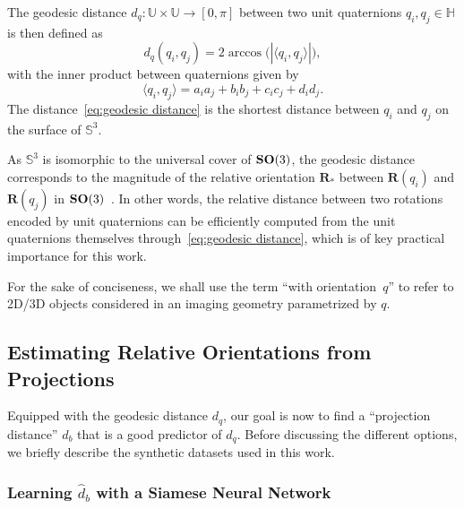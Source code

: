The geodesic distance $d_q:\mathbb{U}\times\mathbb{U}\rightarrow [0,\pi]$ between two unit quaternions $q_i, q_j\in\mathbb{H}$ is then defined as
\begin{equation}
    \label{eq:geodesic distance}
    d_q(q_i,q_j)=2\arccos\big(|\langle q_i, q_j \rangle|\big),
\end{equation}
with the inner product between quaternions given by
\begin{equation}
    \label{eq:inner-product-quaternions}
    \langle q_i, q_j \rangle = a_ia_j+b_ib_j+c_ic_j+d_id_j.
\end{equation}
The distance~\eqref{eq:geodesic distance} is the shortest distance between $q_i$ and $q_j$ on the surface of $\mathbb{S}^3$.

As $\mathbb{S}^3$ is isomorphic to the universal cover of $\mathrm{\mathbf{SO}}(3)$, the geodesic distance corresponds to the magnitude of the relative orientation $\mathbf{R}_*$ between $\mathbf{R}(q_i)$ and $\mathbf{R}(q_j)$ in $\mathrm{\mathbf{SO}}(3)$~\cite{huynh2009metrics}. In other words, the relative distance between two rotations encoded by unit quaternions can be efficiently computed from the unit quaternions themselves through~\eqref{eq:geodesic distance}, which is of key practical importance for this work.

For the sake of conciseness, we shall use the term ``with orientation~$q$'' to refer to 2D/3D objects considered in an imaging geometry parametrized by $q$.

\subsection{Estimating Relative Orientations from Projections}
\label{sec:estimating-relative-orientations}

Equipped with the geodesic distance $d_q$, our goal is now to find a ``projection distance'' $d_b$ that is a good predictor of $d_q$. Before discussing the different options, we briefly describe the synthetic datasets used in this work.

\subsubsection{Learning $\widehat{d}_b$ with a Siamese Neural Network}

